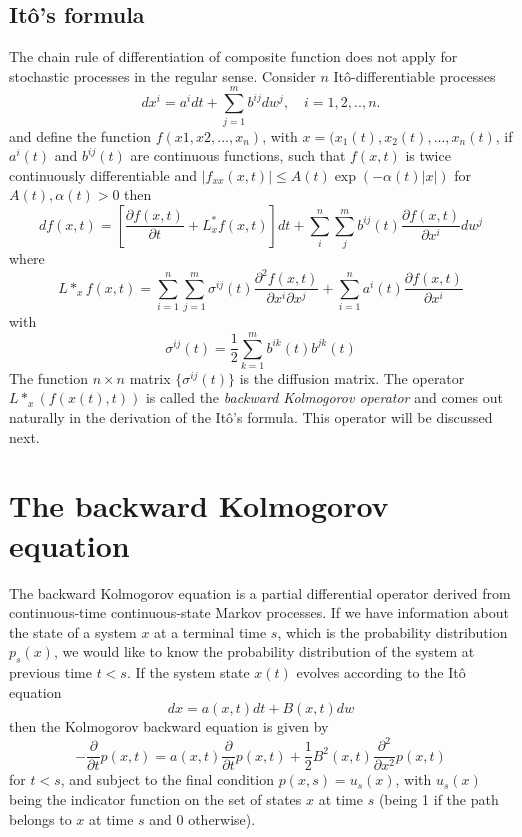 \documentclass[12pt]{book}
\begin{document}
\subsection{It\^{o}'s formula}\label{subsection:itosFormula}
The chain rule of differentiation of composite function does not apply for stochastic processes in the regular sense. Consider $n$  It\^{o}-differentiable processes 
\begin{equation*}
dx^i = a^idt+\sum_{j=1}^m b^{ij}dw^j, \quad i=1,2,..,n.
\end{equation*} 
and define the function $f(x1,x2,...,x_n)$, with $x=(x_1(t),x_2(t),...,x_n(t)$,
if $a^i(t)$ and $b^{ij}(t)$ are continuous functions, such that $f(x,t)$ is twice continuously differentiable and $|f_{xx}(x,t)|\leq A(t)\exp(-\alpha(t)|x|)$ for $A(t),\alpha(t)>0$ then
\begin{equation*}\label{eq:itoFormula}
df(x,t) = \left[\frac{\partial f(x,t)}{\partial t}+L^*_xf(x,t) \right]dt+\sum_{i}^n \sum_j^m b^{ij}(t)\frac{\partial f(x,t)}{\partial x^i}dw^j
\end{equation*}
where 
\begin{equation*}
L*_xf(x,t)=\sum_{i=1}^n\sum_{j=1}^m\sigma^{ij}(t)\frac{\partial^2f(x,t)}{\partial x^i \partial x^j}+\sum_{i=1}^n a^i(t)\frac{\partial f(x,t)}{\partial x^i}
\end{equation*}
with 
\begin{equation*}
\sigma^{ij}(t)=\frac{1}{2}\sum_{k=1}^m b^{ik}(t)b^{jk}(t)
\end{equation*}
The function $n\times n$ matrix $\{\sigma^{ij}(t) \}$ is the diffusion matrix. 
The operator $L*_x(f(x(t),t))$ is called the \textit{backward Kolmogorov operator} and comes out naturally in the derivation of the It\^{o}'s formula. This operator will be discussed next. 

\section{The backward Kolmogorov equation}\label{section:backwardKolmogorovEquation}
The backward Kolmogorov equation is a partial differential operator derived from continuous-time continuous-state Markov processes. If we have information about the state of a system $x$ at a terminal time $s$, which is the probability distribution $p_s(x)$, we would like to know the probability distribution of the system at previous time $t<s$.
If the system state $x(t)$ evolves according to the It\^o equation 
\begin{equation*}
dx=a(x,t)dt+B(x,t)dw
\end{equation*}
then the Kolmogorov backward equation is given by 
\begin{equation}\label{eq:kolmogorovBackwardEquation}
-\frac{\partial}{\partial t}p(x,t) = a(x,t)\frac{\partial}{\partial t}p(x,t)+\frac{1}{2}B^2(x,t)\frac{\partial^2}{\partial x^2}p(x,t)
\end{equation}
for $t<s$, and subject to the final condition $p(x,s)=u_s(x)$, with $u_s(x)$ being the indicator function on the set of states $x$ at time $s$ (being 1 if the path belongs to $x$ at time $s$ and 0 otherwise).
\end{document}
